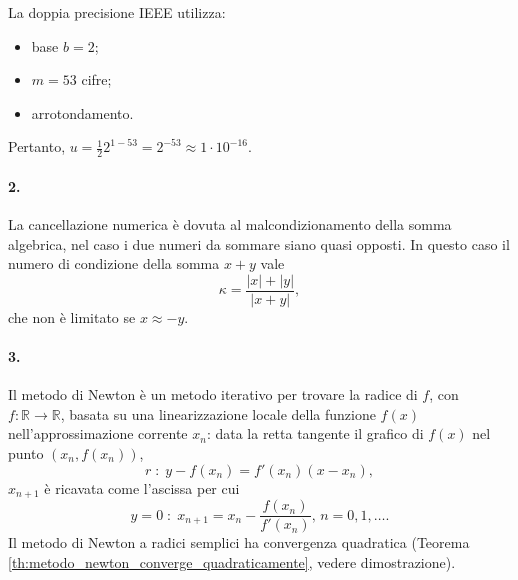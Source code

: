 \noindent La doppia precisione IEEE utilizza:
\begin{itemize}
    \item base $b=2$;
    \item $m=53$ cifre;
    \item arrotondamento.
\end{itemize}
Pertanto, $u=\frac{1}{2}2^{1-53}=2^{-53}\approx 1\cdot 10^{-16}$.

\paragraph{2.}
La cancellazione numerica è dovuta al malcondizionamento della somma algebrica, nel caso i due numeri da sommare siano quasi opposti. In questo caso il numero di condizione della somma $x+y$ vale
\begin{equation*}
    \kappa=\frac{|x|+|y|}{|x+y|},
\end{equation*}
che non è limitato se $x\approx -y$.

\paragraph{3.} Il metodo di Newton è un metodo iterativo per trovare la radice di $f$, con $f:\mathbb R\rightarrow\mathbb R$, basata su una linearizzazione locale della funzione $f(x)$ nell'approssimazione corrente $x_n$: data la retta tangente il grafico di $f(x)$ nel punto $(x_n, f(x_n))$, 
\begin{equation*}
    r\;:\;y-f(x_n)=f'(x_n)(x-x_n),
\end{equation*}
$x_{n+1}$ è ricavata come l'ascissa per cui
\begin{equation*}
    y=0\;:\;x_{n+1}=x_n-\frac{f(x_n)}{f'(x_n)},\, n=0,1,\hdots.
\end{equation*}
Il metodo di Newton a radici semplici ha convergenza quadratica (Teorema \ref{th:metodo_newton_converge_quadraticamente}, vedere dimostrazione).

